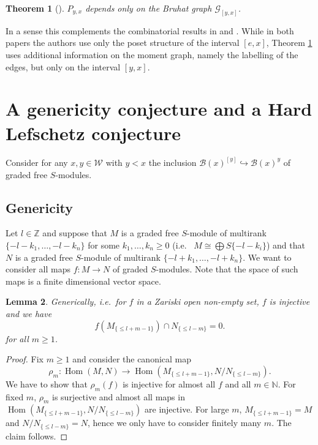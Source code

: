 \documentclass[12pt]{amsart}
\newtheorem{theorem}{Theorem}[section]
\newtheorem{lemma}[theorem]{Lemma}
\theoremstyle{definition}
\theoremstyle{remark}
\def\varle{\leqslant}
\newcommand{\CG}{{\mathcal G}}
\newcommand{\CW}{{\mathcal W}}
\newcommand{\SB}{{\mathscr B}}
\newcommand{\DZ}{{\mathbb Z}}
\newcommand{\DN}{{\mathbb N}}
\newcommand{\Hom}{{\operatorname{Hom}}}
\newcommand{\inj}{{\hookrightarrow}}
\begin{document}
\begin{theorem}[{\cite[Theorem 7.3]{Br1}}]\label{pol} $P_{y,x}$ depends only on the Bruhat graph $\CG_{[y,x]}$.
\end{theorem}

In a sense this complements the combinatorial results in \cite{BCM} and \cite{dC}. While in both papers  the authors use only the poset structure of the interval $[e,x]$, Theorem \ref{pol} uses additional information on the moment graph, namely the labelling of the edges, but only on the interval $[y,x]$.




\section{A  genericity conjecture and a Hard Lefschetz conjecture}

Consider for any $x,y\in\CW$ with $y<x$ the inclusion $\SB(x)^{[y]}\inj\SB(x)^y$ of graded free $S$-modules.  

\subsection{Genericity}
Let $l\in\DZ$ and 
suppose that $M$ is a graded free $S$-module of multirank $\{-l-k_1,\dots,-l-k_n\}$ for some $k_1,\dots,k_n\geq 0$ (i.e.~ $M\cong \bigoplus S\{-l-k_i\}$) and that $N$ is a graded free $S$-module of multirank $\{-l+k_1,\dots, -l+k_n\}$. We want to consider all maps $f\colon M\to N$ of graded $S$-modules. Note that the space of such maps is a finite dimensional vector space. 

\begin{lemma}\label{genmaps} Generically, i.e.~for $f$ in a Zariski open non-empty set, $f$ is injective and we have
$$
f(M_{\{\varle  l+ m-1\}})\cap N_{\{\varle  l-m\}}=0.
$$
for all $m\geq 1$.
\end{lemma}

\begin{proof} Fix $m\geq 1$ and consider the canonical map 
$$
\rho_m\colon \Hom(M,N)\to \Hom(M_{\{\varle  l+m-1\}}, N/N_{\{\varle  l-m\}}).
$$ 
We have to show that $\rho_m(f)$ is injective for almost all $f$ and all $m\in\DN$.  For fixed $m$, $\rho_m$ is surjective and almost all maps in $\Hom(M_{\{\varle  l+m-1\}}, N/N_{\{\varle  l-m\}})$ are injective. For large $m$, $M_{\{\varle  l+m-1\}}=M$ and $N/N_{\{\varle  l-m\}}=N$, hence we only have to consider finitely many $m$. The claim follows.
\end{proof}
\end{document}
